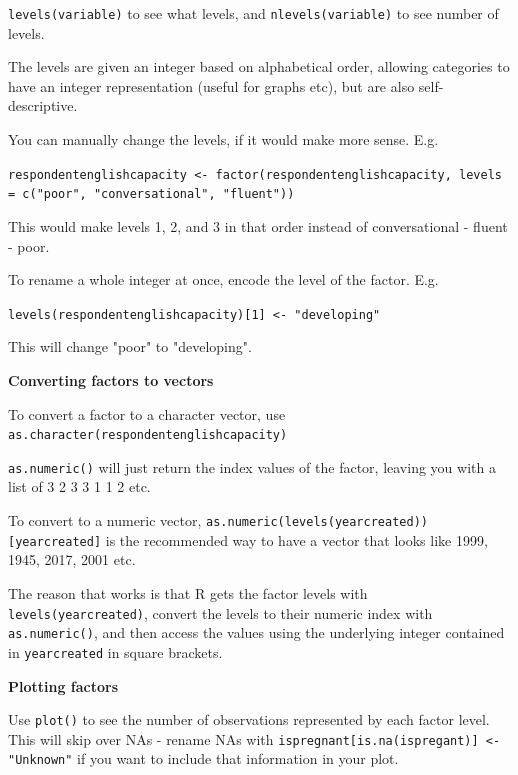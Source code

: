 \documentclass[12pt]{article}
\begin{document}
\texttt{levels(variable)} to see what levels, and \texttt{nlevels(variable)} to see number of levels.

The levels are given an integer based on alphabetical order, allowing categories to have an integer representation (useful for graphs etc), but are also self-descriptive.

You can manually change the levels, if it would make more sense. E.g. 

\texttt{respondentenglishcapacity <- factor(respondentenglishcapacity, levels = c("poor", "conversational", "fluent"))} 

This would make levels 1, 2, and 3 in that order instead of conversational - fluent - poor.

To rename a whole integer at once, encode the level of the factor. E.g. 

\texttt{levels(respondentenglishcapacity)[1] <- "developing"} 

This will change "poor" to "developing".

\vspace{1em}
\textbf{Converting factors to vectors}

To convert a factor to a character vector, use \texttt{as.character(respondentenglishcapacity)}

\texttt{as.numeric()} will just return the index values of the factor, leaving you with a list of 3 2 3 3 1 1 2 etc.

To convert to a numeric vector, \texttt{as.numeric(levels(yearcreated))[yearcreated]} is the recommended way to have a vector that looks like 1999, 1945, 2017, 2001 etc. 

The reason that works is that R gets the factor levels with \texttt{levels(yearcreated)}, convert the levels to their numeric index with \texttt{as.numeric()}, and then access the values using the underlying integer contained in \texttt{yearcreated} in square brackets.

\vspace{1em}\textbf{Plotting factors}

Use \texttt{plot()} to see the number of observations represented by each factor level. This will skip over NAs - rename NAs with \texttt{ispregnant[is.na(ispregant)] <- "Unknown"} if you want to include that information in your plot.
\end{document}
